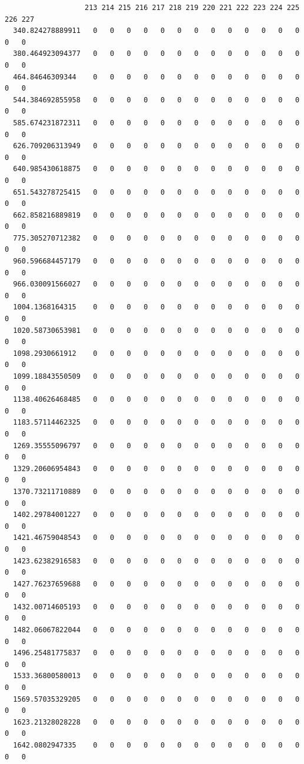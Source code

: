 \documentclass[
  letterpaper,
  DIV=11,
  numbers=noendperiod]{scrartcl}
\begin{document}
\begin{verbatim}
                   213 214 215 216 217 218 219 220 221 222 223 224 225 226 227
  340.824278889911   0   0   0   0   0   0   0   0   0   0   0   0   0   0   0
  380.464923094377   0   0   0   0   0   0   0   0   0   0   0   0   0   0   0
  464.84646309344    0   0   0   0   0   0   0   0   0   0   0   0   0   0   0
  544.384692855958   0   0   0   0   0   0   0   0   0   0   0   0   0   0   0
  585.674231872311   0   0   0   0   0   0   0   0   0   0   0   0   0   0   0
  626.709206313949   0   0   0   0   0   0   0   0   0   0   0   0   0   0   0
  640.985430618875   0   0   0   0   0   0   0   0   0   0   0   0   0   0   0
  651.543278725415   0   0   0   0   0   0   0   0   0   0   0   0   0   0   0
  662.858216889819   0   0   0   0   0   0   0   0   0   0   0   0   0   0   0
  775.305270712382   0   0   0   0   0   0   0   0   0   0   0   0   0   0   0
  960.596684457179   0   0   0   0   0   0   0   0   0   0   0   0   0   0   0
  966.030091566027   0   0   0   0   0   0   0   0   0   0   0   0   0   0   0
  1004.1368164315    0   0   0   0   0   0   0   0   0   0   0   0   0   0   0
  1020.58730653981   0   0   0   0   0   0   0   0   0   0   0   0   0   0   0
  1098.2930661912    0   0   0   0   0   0   0   0   0   0   0   0   0   0   0
  1099.18843550509   0   0   0   0   0   0   0   0   0   0   0   0   0   0   0
  1138.40626468485   0   0   0   0   0   0   0   0   0   0   0   0   0   0   0
  1183.57114462325   0   0   0   0   0   0   0   0   0   0   0   0   0   0   0
  1269.35555096797   0   0   0   0   0   0   0   0   0   0   0   0   0   0   0
  1329.20606954843   0   0   0   0   0   0   0   0   0   0   0   0   0   0   0
  1370.73211710889   0   0   0   0   0   0   0   0   0   0   0   0   0   0   0
  1402.29784001227   0   0   0   0   0   0   0   0   0   0   0   0   0   0   0
  1421.46759048543   0   0   0   0   0   0   0   0   0   0   0   0   0   0   0
  1423.62382916583   0   0   0   0   0   0   0   0   0   0   0   0   0   0   0
  1427.76237659688   0   0   0   0   0   0   0   0   0   0   0   0   0   0   0
  1432.00714605193   0   0   0   0   0   0   0   0   0   0   0   0   0   0   0
  1482.06067822044   0   0   0   0   0   0   0   0   0   0   0   0   0   0   0
  1496.25481775837   0   0   0   0   0   0   0   0   0   0   0   0   0   0   0
  1533.36800580013   0   0   0   0   0   0   0   0   0   0   0   0   0   0   0
  1569.57035329205   0   0   0   0   0   0   0   0   0   0   0   0   0   0   0
  1623.21328028228   0   0   0   0   0   0   0   0   0   0   0   0   0   0   0
  1642.0802947335    0   0   0   0   0   0   0   0   0   0   0   0   0   0   0

\end{verbatim}
\end{document}
